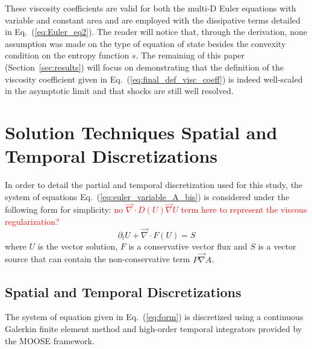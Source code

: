 \documentclass[preprint,10pt]{elsarticle}
\renewcommand{\div}{\vec{\nabla}\! \cdot \!}
\newcommand{\grad}{\vec{\nabla}}
\newcommand{\eqt}[1]{Eq.~(\ref{#1})}                     %
\newcommand{\sct}[1]{Section~\ref{#1}}                   %
\newcommand{\tcr}[1]{\textcolor{red}{#1}}
\begin{document}
These viscosity coefficients are valid for both the multi-D Euler equations with variable and constant area and are employed with the dissipative terms detailed in \eqt{eq:Euler_eq2}. The reader will notice that, through the derivation, none assumption was made on the type of equation of state besides the convexity condition on the entropy function $s$. The remaining of this paper (\sct{sec:results}) will focus on demonstrating that the definition of the viscosity coefficient given in \eqt{eq:final_def_visc_coeff} is indeed well-scaled in the asymptotic limit and that shocks are still well resolved. 
\section{Solution Techniques Spatial and Temporal Discretizations} \label{sec:solution_tech}
In order to detail the partial and temporal discretization used for this study, the system of equations \eqt{eq:euler_variable_A_bis} is considered under the following form for simplicity:
\tcr{no $\div D(U) \grad U$ term here to represent the viscous regularization?}
\begin{equation}
\label{eq:form}
\partial_t U + \div F\left( U \right) = S
\end{equation}
where $U$ is the vector solution, $F$ is a conservative vector flux and $S$ is a vector source that can contain the non-conservative term $P\grad A$.
\subsection{Spatial and Temporal Discretizations} \label{sec:disc}
The system of equation given in \eqt{eq:form} is discretized using a continuous Galerkin finite element method and high-order temporal integrators provided by the MOOSE framework.
\end{document}
